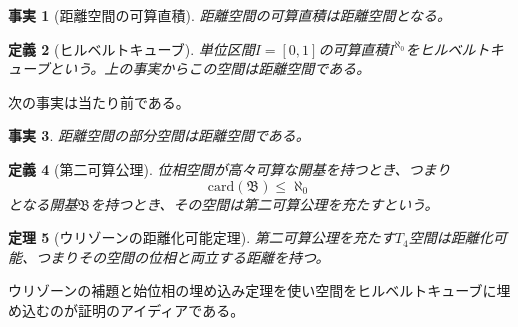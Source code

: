 \documentclass{jsarticle}
\newtheorem{theorem}{定理}
\newtheorem{defnition}[theorem]{定義}
\newtheorem{fact}[theorem]{事実}
\begin{document}
\begin{fact}[距離空間の可算直積]距離空間の可算直積は距離空間となる。
\end{fact}

\begin{defnition}[ヒルベルトキューブ]
単位区間$I=[0,1]$の可算直積$I^{\aleph_0}$をヒルベルトキューブという。上の事実からこの空間は距離空間である。
\end{defnition}

次の事実は当たり前である。
\begin{fact}
距離空間の部分空間は距離空間である。
\end{fact}

\begin{defnition}[第二可算公理]位相空間が高々可算な開基を持つとき、つまり
\[
\text{card$(\mathfrak{B})$}\le \aleph_0
\]となる開基$\mathfrak{B}$を持つとき、その空間は第二可算公理を充たすという。
\end{defnition}

\begin{theorem}[ウリゾーンの距離化可能定理]第二可算公理を充たす$T_4$空間は距離化可能、つまりその空間の位相と両立する距離を持つ。
\end{theorem}
ウリゾーンの補題と始位相の埋め込み定理を使い空間をヒルベルトキューブに埋め込むのが証明のアイディアである。
\end{document}
